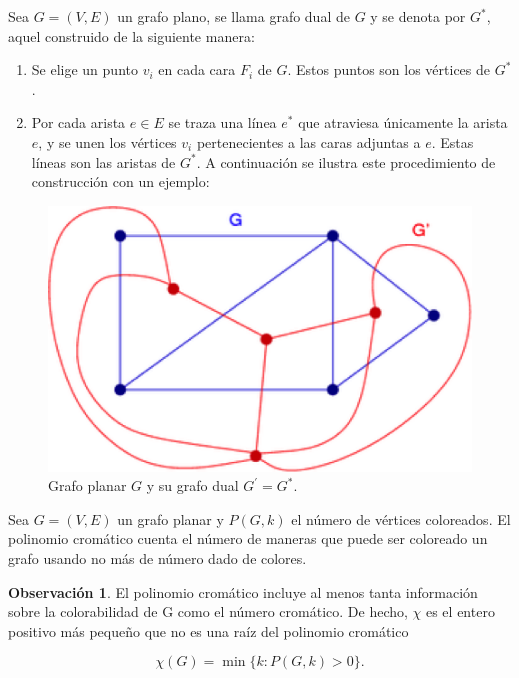 \documentclass[spanish, utf8,handout]{beamer} %
\theoremstyle{definition}
\newtheorem{remark}{Observación}
\begin{document}
\begin{frame}[allowframebreaks]
\begin{example}
	Sea $G=(V,E)$ un grafo plano, se llama grafo dual de $G$ y se denota por $G^{\ast}$, aquel construido de la siguiente manera:
	
	\begin{enumerate}
		\item Se elige un punto $v_i$ en cada cara $F_i$ de $G$. Estos puntos son los vértices de $G^{\ast}$.
		
		\item Por cada arista $e\in E$ se traza una línea $e^{\ast}$ que atraviesa únicamente la arista $e$, y se unen los vértices $v_i$ pertenecientes a las caras adjuntas a $e$. Estas líneas son las aristas de $G^{\ast}$. A continuación se ilustra este procedimiento de construcción con un ejemplo:
	\end{enumerate}
\end{example}

\begin{figure}[H]
	\captionsetup{justification=centering,margin=0.5cm}
	\centering
	\includegraphics{example3}
	\caption{Grafo planar $G$ y	su grafo dual $G^{\prime}=G^{\ast}$.}
\end{figure}

\begin{definition}
Sea $G=(V,E)$ un grafo planar y $P(G,k)$ el número de vértices coloreados.
El polinomio cromático cuenta el número de maneras que puede ser coloreado un grafo usando no más de número dado de colores.
\end{definition}

\begin{remark}
El polinomio cromático incluye al menos tanta información sobre la colorabilidad de G como el número cromático. De hecho, $\chi$ es el entero positivo más pequeño que no es una raíz del polinomio cromático

\begin{equation*}
\chi(G)=\min\{k\colon P(G,k)>0\}.
\end{equation*}
\end{remark}

\end{frame}
\end{document}
